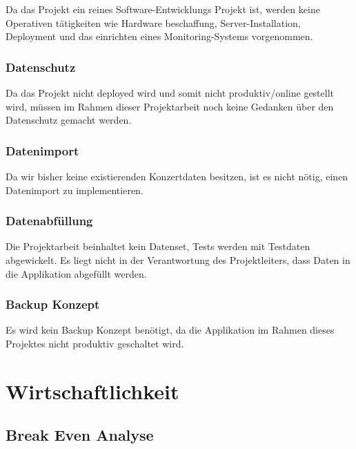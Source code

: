 Da das Projekt ein reines Software-Entwicklungs Projekt ist, werden
keine Operativen tätigkeiten wie Hardware beschaffung,
Server-Installation, Deployment und das einrichten eines
Monitoring-Systems vorgenommen.

\subsubsection{Datenschutz}\label{datenschutz}

Da das Projekt nicht deployed wird und somit nicht produktiv/online
gestellt wird, müssen im Rahmen dieser Projektarbeit noch keine Gedanken
über den Datenschutz gemacht werden.

\subsubsection{Datenimport}\label{datenimport}

Da wir bisher keine existierenden Konzertdaten besitzen, ist es nicht
nötig, einen Datenimport zu implementieren.

\subsubsection{Datenabfüllung}\label{datenabfuxfcllung}

Die Projektarbeit beinhaltet kein Datenset, Tests werden mit Testdaten
abgewickelt. Es liegt nicht in der Verantwortung des Projektleiters,
dass Daten in die Applikation abgefüllt werden.

\subsubsection{Backup Konzept}\label{backup-konzept}

Es wird kein Backup Konzept benötigt, da die Applikation im Rahmen
dieses Projektes nicht produktiv geschaltet wird.

\section{Wirtschaftlichkeit}\label{wirtschaftlichkeit}

\subsection{Break Even Analyse}\label{break-even-analyse}
